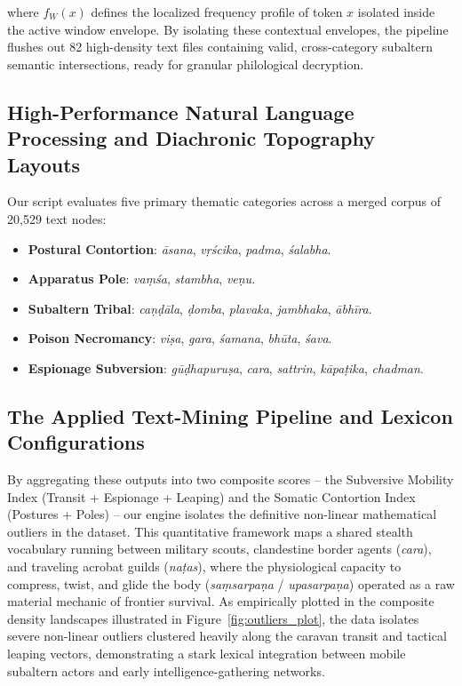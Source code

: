 \documentclass[11pt,twoside,letterpaper]{article}
\begin{document}
where $f_W(x)$ defines the localized frequency profile of token $x$ isolated inside the active window envelope. By isolating these contextual envelopes, the pipeline flushes out 82 high-density text files containing valid, cross-category subaltern semantic intersections, ready for granular philological decryption.

\subsection{High-Performance Natural Language Processing and Diachronic Topography Layouts}
Our script evaluates five primary thematic categories across a merged corpus of 20,529 text nodes:

\begin{itemize}
    \item \textbf{Postural Contortion}: \textit{\={a}sana}, \textit{v\d{r}\'scika}, \textit{padma}, \textit{\'salabha}.
    \item \textbf{Apparatus Pole}: \textit{va\d{m}\'sa}, \textit{stambha}, \textit{ve\d{n}u}.
    \item \textbf{Subaltern Tribal}: \textit{ca\d{n}\d{d}\={a}la}, \textit{\d{d}omba}, \textit{plavaka}, \textit{jambhaka}, \textit{\={a}bh\={i}ra}.
    \item \textbf{Poison Necromancy}: \textit{vi\d{s}a}, \textit{gara}, \textit{\'samana}, \textit{bh\={u}ta}, \textit{\'sava}.
    \item \textbf{Espionage Subversion}: \textit{g\={u}\d{d}hapuru\d{s}a}, \textit{cara}, \textit{sattrin}, \textit{k\={a}pa\d{t}ika}, \textit{chadman}.
\end{itemize}

\subsection{The Applied Text-Mining Pipeline and Lexicon Configurations}
By aggregating these outputs into two composite scores -- the Subversive Mobility Index (Transit + Espionage + Leaping) and the Somatic Contortion Index (Postures + Poles) -- our engine isolates the definitive non-linear mathematical outliers in the dataset. This quantitative framework maps a shared stealth vocabulary running between military scouts, clandestine border agents (\textit{cara}), and traveling acrobat guilds (\textit{na\d{t}as}), where the physiological capacity to compress, twist, and glide the body (\textit{sa\d{m}sarpa\d{n}a} / \textit{upasarpa\d{n}a}) operated as a raw material mechanic of frontier survival. As empirically plotted in the composite density landscapes illustrated in Figure~\ref{fig:outliers_plot}, the data isolates severe non-linear outliers clustered heavily along the caravan transit and tactical leaping vectors, demonstrating a stark lexical integration between mobile subaltern actors and early intelligence-gathering networks.
\end{document}
